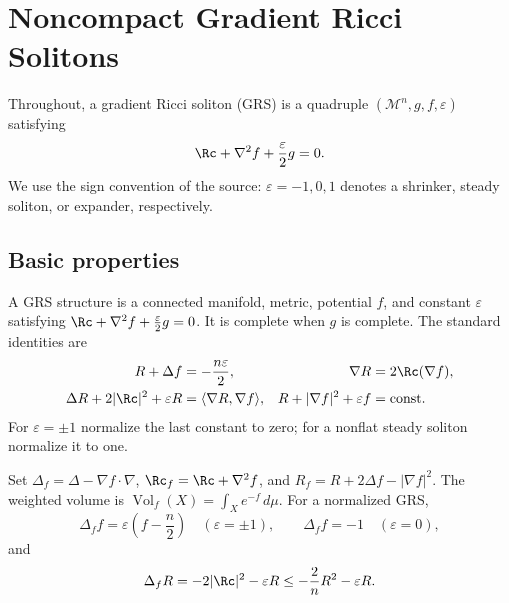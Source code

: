 \chapter[27]{Noncompact Gradient Ricci Solitons}
\label{ch:chow-iv-noncompact-gradient-ricci-solitons}

Throughout, a gradient Ricci soliton (GRS) is a quadruple
$(\mathcal M^n,g,f,\varepsilon)$ satisfying
\[
\Rc+\nabla^2f+\frac{\varepsilon}{2}g=0.
\]
We use the sign convention of the source: $\varepsilon=-1,0,1$ denotes a
shrinker, steady soliton, or expander, respectively.

\section{Basic properties}

\begin{definition}
\label{def:chow-iv-grs-structure}
A GRS structure is a connected manifold, metric, potential $f$, and constant
$\varepsilon$ satisfying $\Rc+\nabla^2f+\frac{\varepsilon}{2}g=0$.  It is complete
when $g$ is complete.  The standard identities are
\begin{align*}
R+\Delta f&=-\frac{n\varepsilon}{2},&
\nabla R&=2\Rc(\nabla f),\\
\Delta R+2|\Rc|^2+\varepsilon R&=\langle\nabla R,\nabla f\rangle,&
R+|\nabla f|^2+\varepsilon f&=\mathrm{const}.
\end{align*}
For $\varepsilon=\pm1$ normalize the last constant to zero; for a nonflat
steady soliton normalize it to one.
\end{definition}

\begin{definition}
\label{def:chow-iv-weighted-operators}
Set $\Delta_f=\Delta-\nabla f\cdot\nabla$, $\Rc_f=\Rc+\nabla^2f$, and
$R_f=R+2\Delta f-|\nabla f|^2$.  The weighted volume is
$\operatorname{Vol}_f(X)=\int_Xe^{-f}\,d\mu$.  For a normalized GRS,
\[
\Delta_f f=\varepsilon\left(f-\frac n2\right)\quad(\varepsilon=\pm1),
\qquad \Delta_f f=-1\quad(\varepsilon=0),
\]
and
\[
\Delta_fR=-2|\Rc|^2-\varepsilon R\le -\frac2nR^2-\varepsilon R.
\]
\end{definition}

